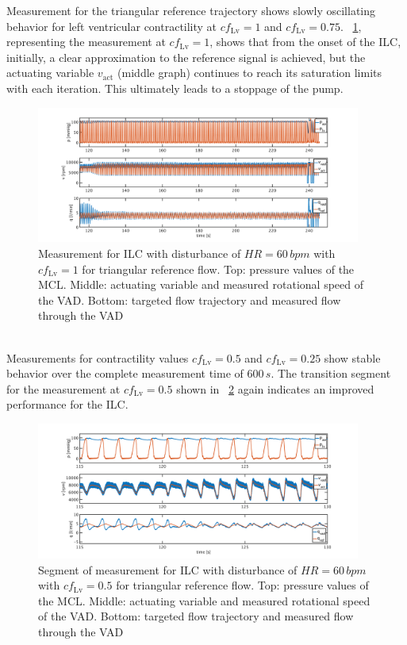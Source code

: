Measurement for the triangular reference trajectory shows slowly oscillating behavior for left ventricular contractility at $cf_{\mathrm{Lv}}=1$ and $cf_{\mathrm{Lv}}=0.75$. \figurename~\ref{fig:pi_to_ilc_dist_triang_cf1}, representing the measurement at $cf_{\mathrm{Lv}}=1$, shows that from the onset of the ILC, initially, a clear approximation to the reference signal is achieved, but the actuating variable $v_{\mathrm{act}}$ (middle graph) continues to reach its saturation limits with each iteration. This ultimately leads to a stoppage of the pump.
\begin{figure}[ht!]
  \centering
  \includegraphics[width=0.95\textwidth]{images/chapt_5/ILC/pi_to_ilc_dist_triang_cf1.pdf}
  \caption[Measurement for ILC with disturbance of $HR=60\,bpm$ with $cf_{\mathrm{Lv}}=1$ for triangular reference flow]{Measurement for ILC with disturbance of $HR=60\,bpm$ with $cf_{\mathrm{Lv}}=1$ for triangular reference flow. Top:  pressure values of the MCL. Middle: actuating variable and measured rotational speed of the VAD. Bottom: targeted flow trajectory and measured flow through the VAD}
  \label{fig:pi_to_ilc_dist_triang_cf1}
\end{figure}
\\Measurements for contractility values $cf_{\mathrm{Lv}}=0.5$ and $cf_{\mathrm{Lv}}=0.25$ show stable behavior over the complete measurement time of $600\,s$. The transition segment for the measurement at $cf_{\mathrm{Lv}}=0.5$ shown in \figurename~\ref{fig:pi_to_ilc_dist_triang_cf50} again indicates an improved performance for the ILC.
\begin{figure}[ht!]
  \centering
  \includegraphics[width=0.95\textwidth]{images/chapt_5/ILC/pi_to_ilc_dist_triang_cf50.pdf}
  \caption[]{Segment of measurement for ILC with disturbance of $HR=60\,bpm$ with $cf_{\mathrm{Lv}}=0.5$ for triangular reference flow. Top:  pressure values of the MCL. Middle: actuating variable and measured rotational speed of the VAD. Bottom: targeted flow trajectory and measured flow through the VAD}
  \label{fig:pi_to_ilc_dist_triang_cf50}
\end{figure}
